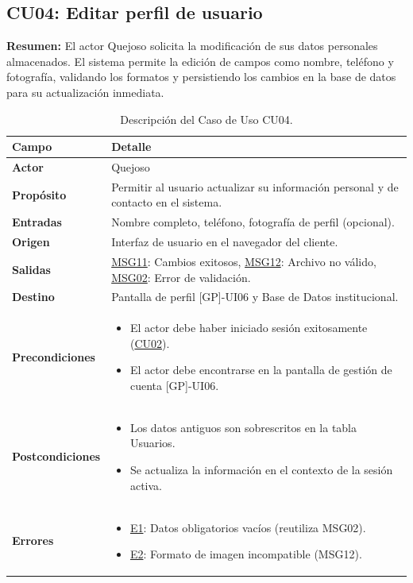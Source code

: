 \begin{appendices}
\subsection{CU04: Editar perfil de usuario}

\textbf{Resumen:} 
El actor Quejoso solicita la modificación de sus datos personales almacenados. El sistema permite la edición de campos como nombre, teléfono y fotografía, validando los formatos y persistiendo los cambios en la base de datos para su actualización inmediata.

\begin{table}[htbp]
\centering
\small
\begin{tabular}{|p{3.5cm}|p{10.5cm}|}
\hline
\rowcolor[HTML]{EFEFEF} 
\textbf{Campo} & \textbf{Detalle} \\ \hline
\textbf{Actor} & Quejoso \\ \hline
\textbf{Propósito} & Permitir al usuario actualizar su información personal y de contacto en el sistema. \\ \hline
\textbf{Entradas} & Nombre completo, teléfono, fotografía de perfil (opcional). \\ \hline
\textbf{Origen} & Interfaz de usuario en el navegador del cliente. \\ \hline
\textbf{Salidas} & \hyperlink{msg:MSG11}{MSG11}: Cambios exitosos, \hyperlink{msg:MSG12}{MSG12}: Archivo no válido, \hyperlink{msg:MSG02}{MSG02}: Error de validación. \\ \hline
\textbf{Destino} & Pantalla de perfil [GP]-UI06 y Base de Datos institucional. \\ \hline
\textbf{Precondiciones} & 
\begin{itemize}[nosep, leftmargin=*]
    \item El actor debe haber iniciado sesión exitosamente (\hyperlink{anexo:casos_uso}{CU02}).
    \item El actor debe encontrarse en la pantalla de gestión de cuenta [GP]-UI06.
\end{itemize} \\ \hline
\textbf{Postcondiciones} & 
\begin{itemize}[nosep, leftmargin=*]
    \item Los datos antiguos son sobrescritos en la tabla Usuarios.
    \item Se actualiza la información en el contexto de la sesión activa.
\end{itemize} \\ \hline
\textbf{Errores} & 
\begin{itemize}[nosep, leftmargin=*]
    \item \hyperlink{msg:MSG02}{E1}: Datos obligatorios vacíos (reutiliza MSG02).
    \item \hyperlink{err:E7}{E2}: Formato de imagen incompatible (MSG12).
\end{itemize} \\ \hline
\end{tabular}
\caption{Descripción del Caso de Uso CU04.}
\label{tab:cu04_especificacion}
\end{table}


\end{appendices}
